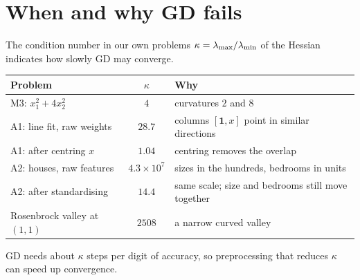 \section{When and why GD fails}

\begin{frame}{The condition number in our own problems}
  \small
  $\kappa = \lambda_{\max}/\lambda_{\min}$ of the Hessian indicates how slowly GD may converge.
  \vspace{4pt}
  \begin{center}
  \begin{tabular}{@{}l c l@{}}
    \toprule
    Problem & $\kappa$ & Why \\
    \midrule
    M3: $x_1^2 + 4x_2^2$ & $4$ & curvatures $2$ and $8$ \\
    A1: line fit, raw weights & $28.7$ & columns $[\mathbf 1, x]$ point in similar directions \\
    A1: after centring $x$ & $1.04$ & centring removes the overlap \\
    A2: houses, raw features & $4.3\times10^{7}$ & sizes in the hundreds, bedrooms in units \\
    A2: after standardising & $14.4$ & same scale; size and bedrooms still move together \\
    Rosenbrock valley at $(1,1)$ & $2508$ & a narrow curved valley \\
    \bottomrule
  \end{tabular}
  \end{center}
  \footnotesize GD needs about $\kappa$ steps per digit of accuracy, so preprocessing that reduces $\kappa$ can speed up convergence.
\end{frame}

